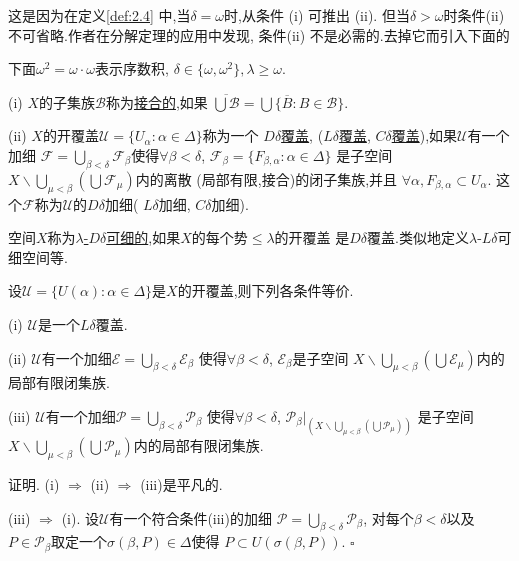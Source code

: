 \documentclass[main.tex]{subfiles}
\begin{document}
这是因为在定义\ref{def:2.4} 中,当$\delta=\omega$时,从条件 (i) 可推出 (ii).
但当$\delta>\omega$时条件(ii) 不可省略.作者在分解定理的应用中发现,
条件(ii) 不是必需的.去掉它而引入下面的

\begin{definition}\label{def1.2.5}
	下面$\omega^2=\omega\cdot\omega$表示序数积, $\delta\in\{\omega,\omega^2\}, \lambda\ge\omega$.
	
	\textnormal{(i)} $X$的子集族$\mathscr{B}$称为\underline{接合的},如果
	$\overline{\bigcup\mathscr{B}}=\bigcup\{\overline{B}: B\in\mathscr{B}\}$.
	
	\textnormal{(ii)} $X$的开覆盖$\mathscr{U}=\{U_\alpha:\alpha\in\Delta\}$称为一个
	\underline{$D\delta$覆盖}, \textnormal{(}\underline{$L\delta$覆盖}, 
	\underline{$C\delta$覆盖}\textnormal{)},如果$\mathscr{U}$有一个加细
   $\mathscr{F}=\bigcup_{\beta<\delta}\mathscr{F}_\beta$使得$\forall\beta<\delta$,
   $\mathscr{F}_\beta=\{F_{\beta,\alpha}: \alpha\in\Delta\}$
   是子空间$X\backslash\bigcup_{\mu<\beta}(\bigcup\mathscr{F}_\mu)$内的离散
   \textnormal{(}局部有限,接合\textnormal{)}的闭子集族,并且
   	$\forall\alpha, F_{\beta,\alpha}\subset U_\alpha$.
   	这个$\mathscr{F}$称为$\mathscr{U}$的$D\delta$加细\textnormal{(}
   	$L\delta$加细, $C\delta$加细\textnormal{)}.
   	
   	空间$X$称为\underline{$\lambda$-$D\delta$可细的},如果$X$的每个势$\le\lambda$的开覆盖
   	是$D\delta$覆盖.类似地定义$\lambda$-$L\delta$可细空间等.
\end{definition}

\begin{proposition}
	设$\mathscr{U}=\{U(\alpha): \alpha\in\Delta\}$是$X$的开覆盖,则下列各条件等价.
	
	\textnormal{(i)} $\mathscr{U}$是一个$L\delta$覆盖.
	
	\textnormal{(ii)}  $\mathscr{U}$有一个加细$\mathscr{E}=\bigcup_{\beta<\delta}\mathscr{E}_\beta$
	使得$\forall\beta<\delta$, $\mathscr{E}_\beta$是子空间
	$X\backslash\bigcup_{\mu<\beta}(\bigcup\mathscr{E}_\mu)$内的局部有限闭集族.
	
	\textnormal{(iii)} $\mathscr{U}$有一个加细$\mathscr{P}=\bigcup_{\beta<\delta}\mathscr{P}_\beta$
	使得$\forall\beta<\delta$, $\mathscr{P}_\beta|_{(X\backslash\bigcup_{\mu<\beta}(\bigcup\mathscr{P}_\mu))}$
	是子空间
	$X\backslash\bigcup_{\mu<\beta}(\bigcup\mathscr{P}_\mu)$内的局部有限闭集族.
\end{proposition}
证明. (i) $\Rightarrow$ (ii) $\Rightarrow$ (iii)是平凡的.

(iii) $\Rightarrow$ (i). 设$\mathscr{U}$有一个符合条件(iii)的加细
$\mathscr{P}=\bigcup_{\beta<\delta}\mathscr{P}_\beta$,
对每个$\beta<\delta$以及$P\in\mathscr{P}_\beta$取定一个$\sigma(\beta,P)\in\Delta$使得
$P\subset U(\sigma(\beta,P))$.
$\square$
\end{document}
